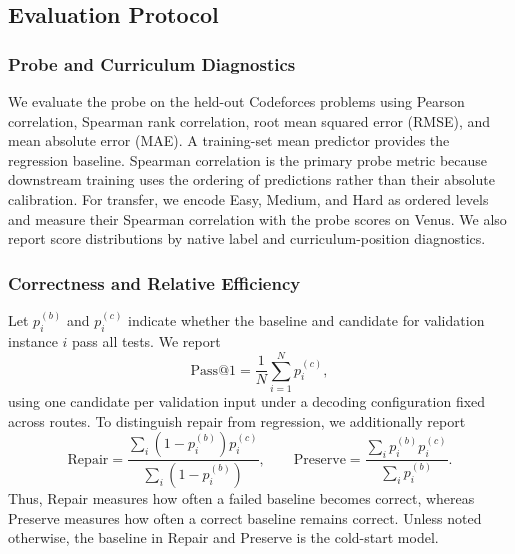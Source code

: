 
\subsection{Evaluation Protocol}

\subsubsection{Probe and Curriculum Diagnostics}

We evaluate the probe on the held-out Codeforces problems using Pearson
correlation, Spearman rank correlation, root mean squared error (RMSE), and mean
absolute error (MAE). A training-set mean predictor provides the regression
baseline. Spearman correlation is the primary probe metric because downstream
training uses the ordering of predictions rather than their absolute
calibration. For transfer, we encode Easy, Medium, and Hard as ordered levels and
measure their Spearman correlation with the probe scores on Venus. We also
report score distributions by native label and curriculum-position diagnostics.

\subsubsection{Correctness and Relative Efficiency}

Let $p_i^{(b)}$ and $p_i^{(c)}$ indicate whether the baseline and candidate for
validation instance $i$ pass all tests. We report
\begin{equation}
    \mathrm{Pass@1} = \frac{1}{N}\sum_{i=1}^{N}p_i^{(c)},
\end{equation}
using one candidate per validation input under a decoding configuration fixed
across routes. To distinguish repair from regression, we additionally report
\begin{equation}
    \mathrm{Repair} =
    \frac{\sum_i (1-p_i^{(b)})p_i^{(c)}}{\sum_i(1-p_i^{(b)})},
    \qquad
    \mathrm{Preserve} =
    \frac{\sum_i p_i^{(b)}p_i^{(c)}}{\sum_i p_i^{(b)}}.
\end{equation}
Thus, Repair measures how often a failed baseline becomes correct, whereas
Preserve measures how often a correct baseline remains correct. Unless noted
otherwise, the baseline in Repair and Preserve is the cold-start model.

